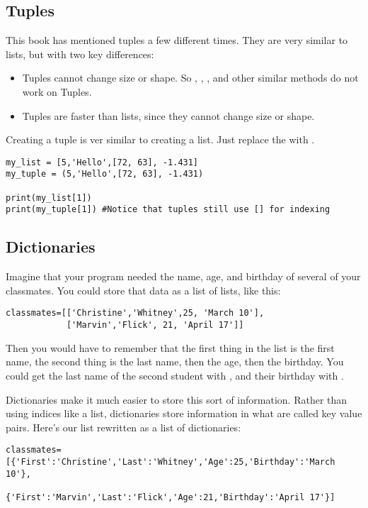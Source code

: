 \subsection*{Tuples}
This book has mentioned tuples a few different times.  They are very similar to lists, but with two key differences:
\begin{itemize}
\item Tuples cannot change size or shape.  So , , , and other similar methods do not work on Tuples.
\item Tuples are faster than lists, since they cannot change size or shape.
\end{itemize}
Creating a tuple is ver similar to creating a list. Just replace the \code{[]} with \code{()}.
\begin{Verbatim}
my_list = [5,'Hello',[72, 63], -1.431]
my_tuple = (5,'Hello',[72, 63], -1.431)

print(my_list[1])
print(my_tuple[1]) #Notice that tuples still use [] for indexing
\end{Verbatim}

\subsection*{Dictionaries}
Imagine that your program needed the name, age, and birthday of several of your classmates.  You could store that data as a list of lists, like this:
\begin{Verbatim}
classmates=[['Christine','Whitney',25, 'March 10'],
            ['Marvin','Flick', 21, 'April 17']]
\end{Verbatim}
Then you would have to remember that the first thing in the list is the first name, the second thing is the last name, then the age, then the birthday. You could get the last name of the second student with , and their birthday with .

Dictionaries make it much easier to store this sort of information.  Rather than using indices like a list, dictionaries store information in what are called key value pairs.  Here's our  list rewritten as a list of dictionaries:

\begin{Verbatim}
classmates=[{'First':'Christine','Last':'Whitney','Age':25,'Birthday':'March 10'},
            {'First':'Marvin','Last':'Flick','Age':21,'Birthday':'April 17'}]
\end{Verbatim}


